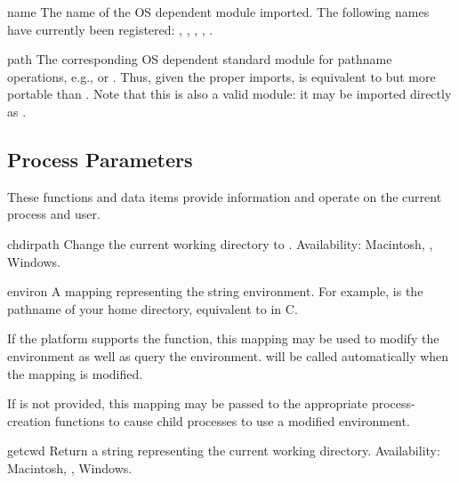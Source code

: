 \begin{datadesc}{name}
The name of the OS dependent module imported.  The following names
have currently been registered: , ,
, , .
\end{datadesc}

\begin{datadesc}{path}
The corresponding OS dependent standard module for pathname
operations, e.g.,  or .  Thus, given
the proper imports,  is equivalent to but
more portable than .  Note that this 
is also a valid module: it may be imported directly as
.
\end{datadesc}



\subsection{Process Parameters \label{os-procinfo}}

These functions and data items provide information and operate on the
current process and user.

\begin{funcdesc}{chdir}{path}
Change the current working directory to .
Availability: Macintosh, \UNIX{}, Windows.
\end{funcdesc}

\begin{datadesc}{environ}
A mapping representing the string environment. For example,
 is the pathname of your home directory,
equivalent to  in C.

If the platform supports the  function, this
mapping may be used to modify the environment as well as query the
environment.   will be called automatically when
the mapping is modified.

If  is not provided, this mapping may be passed to
the appropriate process-creation functions to cause child processes to 
use a modified environment.
\end{datadesc}

\begin{funcdesc}{getcwd}{}
Return a string representing the current working directory.
Availability: Macintosh, \UNIX{}, Windows.
\end{funcdesc}

